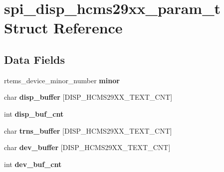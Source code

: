 \hypertarget{structspi__disp__hcms29xx__param__t}{}\section{spi\+\_\+disp\+\_\+hcms29xx\+\_\+param\+\_\+t Struct Reference}
\label{structspi__disp__hcms29xx__param__t}
\subsection*{Data Fields}
\begin{DoxyCompactItemize}
\item 
\mbox{\label{structspi__disp__hcms29xx__param__t_a80e2e111e32aad2c562a624bafaf8aca}} 
rtems\+\_\+device\+\_\+minor\+\_\+number {\bfseries minor}
\item 
\mbox{\label{structspi__disp__hcms29xx__param__t_ae3deeab317790532e8a766b8d9ebe3ef}} 
char {\bfseries disp\+\_\+buffer} \mbox{[}D\+I\+S\+P\+\_\+\+H\+C\+M\+S29\+X\+X\+\_\+\+T\+E\+X\+T\+\_\+\+C\+NT\mbox{]}
\item 
\mbox{\label{structspi__disp__hcms29xx__param__t_a2349482828723fae45f64da18b43dfb5}} 
int {\bfseries disp\+\_\+buf\+\_\+cnt}
\item 
\mbox{\label{structspi__disp__hcms29xx__param__t_ae0ee576ab6fbece1839888388ccda003}} 
char {\bfseries trns\+\_\+buffer} \mbox{[}D\+I\+S\+P\+\_\+\+H\+C\+M\+S29\+X\+X\+\_\+\+T\+E\+X\+T\+\_\+\+C\+NT\mbox{]}
\item 
\mbox{\label{structspi__disp__hcms29xx__param__t_a18a6cad07bf367e302451a0c28713f61}} 
char {\bfseries dev\+\_\+buffer} \mbox{[}D\+I\+S\+P\+\_\+\+H\+C\+M\+S29\+X\+X\+\_\+\+T\+E\+X\+T\+\_\+\+C\+NT\mbox{]}
\item 
\mbox{\label{structspi__disp__hcms29xx__param__t_a3a78280a4209ad69cb91ec6201dfaa5d}} 
int {\bfseries dev\+\_\+buf\+\_\+cnt}
\item 
\mbox{\label{structspi__disp__hcms29xx__param__t_ab3d1f6405e0f70ae14605c4c6fb70fb3}} 

\end{DoxyCompactItemize}
